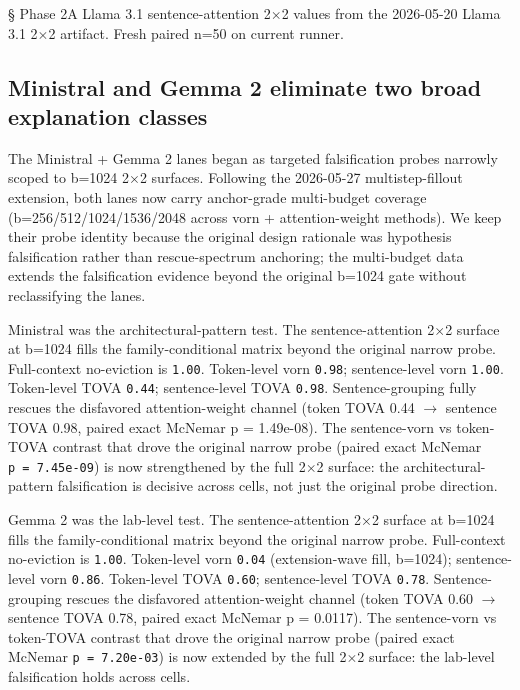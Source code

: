\documentclass[10pt]{article}
\begin{document}
\S{} Phase 2A Llama 3.1 sentence-attention 2$\times$2 values from the 2026-05-20
Llama 3.1 2$\times$2 artifact. Fresh paired n=50 on current runner.

\subsection{Ministral and Gemma 2 eliminate two broad explanation classes}\label{56-ministral-and-gemma-2-eliminate-two-broad-explanation-classes}

The Ministral + Gemma 2 lanes began as targeted falsification probes
narrowly scoped to b=1024 2$\times$2 surfaces. Following the
2026-05-27 multistep-fillout extension, both lanes now carry
anchor-grade multi-budget coverage (b=256/512/1024/1536/2048 across
vorn + attention-weight methods). We keep their probe identity because
the original design rationale was hypothesis falsification rather than
rescue-spectrum anchoring; the multi-budget data extends the
falsification evidence beyond the original b=1024 gate without
reclassifying the lanes.

Ministral was the architectural-pattern test. The sentence-attention
2$\times$2 surface at b=1024 fills the family-conditional matrix beyond the
original narrow probe. Full-context no-eviction is \texttt{1.00}.
Token-level vorn \texttt{0.98}; sentence-level vorn \texttt{1.00}.
Token-level TOVA \texttt{0.44}; sentence-level TOVA \texttt{0.98}.
Sentence-grouping fully rescues the disfavored attention-weight channel
(token TOVA 0.44 $\rightarrow$ sentence TOVA 0.98, paired exact McNemar p =
1.49e-08). The
sentence-vorn vs token-TOVA contrast that drove the original narrow
probe (paired exact McNemar \texttt{p\ =\ 7.45e-09}) is now strengthened
by the full 2$\times$2 surface: the architectural-pattern falsification is
decisive across cells, not just the original probe direction.

Gemma 2 was the lab-level test. The sentence-attention 2$\times$2 surface at
b=1024 fills the family-conditional matrix beyond the original narrow
probe. Full-context no-eviction is \texttt{1.00}. Token-level vorn
\texttt{0.04} (extension-wave fill, b=1024); sentence-level vorn
\texttt{0.86}. Token-level TOVA \texttt{0.60}; sentence-level TOVA
\texttt{0.78}. Sentence-grouping
rescues the disfavored attention-weight channel (token TOVA 0.60 $\rightarrow$
sentence
TOVA 0.78, paired exact McNemar p = 0.0117). The sentence-vorn vs
token-TOVA contrast that drove the original narrow probe (paired exact
McNemar \texttt{p\ =\ 7.20e-03}) is now extended by the full 2$\times$2
surface: the lab-level falsification holds across cells.
\end{document}
